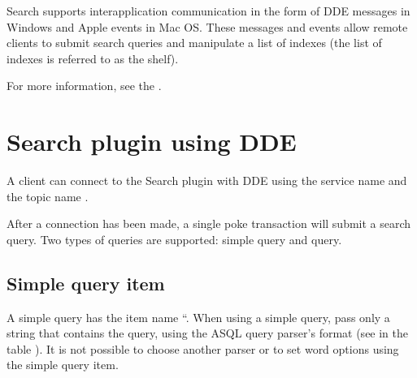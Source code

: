 \documentclass[letterpaper,12pt,english,openany,oneside]{sphinxmanual}
\begin{document}
Search supports interapplication communication in the form of DDE messages in Windows and Apple events in Mac OS. These messages and events allow remote clients to submit search queries and manipulate a list of indexes (the list of indexes is referred to as the shelf).

For more information, see the .




\section{Search plug\sphinxhyphen{}in using DDE}
\label{\detokenize{IAC_API_SearchIntro:search-plug-in-using-dde}}
A client can connect to the Search plug\sphinxhyphen{}in with DDE using the service name  and the topic name .

\begin{sphinxVerbatim}[commandchars=\\\{\}]
   
    
    
     
\end{sphinxVerbatim}

After a connection has been made, a single poke transaction will submit a search query. Two types of queries are supported: simple query and query.


\subsection{Simple query item}
\label{\detokenize{IAC_API_SearchIntro:simple-query-item}}
A simple query has the item name “. When using a simple query, pass only a string that contains the query, using the ASQL query parser’s format (see  in the table ). It is not possible to choose another parser or to set word options using the simple query item.
\end{document}
